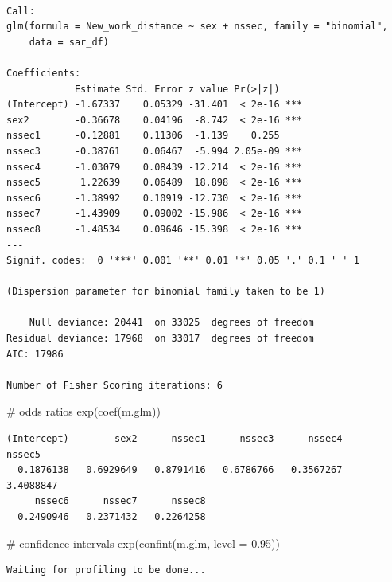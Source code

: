 \documentclass[
  letterpaper,
  DIV=11,
  numbers=noendperiod]{scrreprt}
\newenvironment{Shaded}{\begin{snugshade}}{\end{snugshade}}
\newcommand{\AttributeTok}[1]{\textcolor[rgb]{0.40,0.45,0.13}{#1}}
\newcommand{\CommentTok}[1]{\textcolor[rgb]{0.37,0.37,0.37}{#1}}
\newcommand{\FloatTok}[1]{\textcolor[rgb]{0.68,0.00,0.00}{#1}}
\newcommand{\FunctionTok}[1]{\textcolor[rgb]{0.28,0.35,0.67}{#1}}
\newcommand{\NormalTok}[1]{\textcolor[rgb]{0.00,0.23,0.31}{#1}}
\begin{document}
\begin{verbatim}

Call:
glm(formula = New_work_distance ~ sex + nssec, family = "binomial", 
    data = sar_df)

Coefficients:
            Estimate Std. Error z value Pr(>|z|)    
(Intercept) -1.67337    0.05329 -31.401  < 2e-16 ***
sex2        -0.36678    0.04196  -8.742  < 2e-16 ***
nssec1      -0.12881    0.11306  -1.139    0.255    
nssec3      -0.38761    0.06467  -5.994 2.05e-09 ***
nssec4      -1.03079    0.08439 -12.214  < 2e-16 ***
nssec5       1.22639    0.06489  18.898  < 2e-16 ***
nssec6      -1.38992    0.10919 -12.730  < 2e-16 ***
nssec7      -1.43909    0.09002 -15.986  < 2e-16 ***
nssec8      -1.48534    0.09646 -15.398  < 2e-16 ***
---
Signif. codes:  0 '***' 0.001 '**' 0.01 '*' 0.05 '.' 0.1 ' ' 1

(Dispersion parameter for binomial family taken to be 1)

    Null deviance: 20441  on 33025  degrees of freedom
Residual deviance: 17968  on 33017  degrees of freedom
AIC: 17986

Number of Fisher Scoring iterations: 6
\end{verbatim}

\begin{Shaded}
\begin{Highlighting}[]
\CommentTok{\# odds ratios}
\FunctionTok{exp}\NormalTok{(}\FunctionTok{coef}\NormalTok{(m.glm)) }
\end{Highlighting}
\end{Shaded}

\begin{verbatim}
(Intercept)        sex2      nssec1      nssec3      nssec4      nssec5 
  0.1876138   0.6929649   0.8791416   0.6786766   0.3567267   3.4088847 
     nssec6      nssec7      nssec8 
  0.2490946   0.2371432   0.2264258 
\end{verbatim}

\begin{Shaded}
\begin{Highlighting}[]
\CommentTok{\# confidence intervals}
\FunctionTok{exp}\NormalTok{(}\FunctionTok{confint}\NormalTok{(m.glm, }\AttributeTok{level =} \FloatTok{0.95}\NormalTok{)) }
\end{Highlighting}
\end{Shaded}

\begin{verbatim}
Waiting for profiling to be done...
\end{verbatim}
\end{document}
